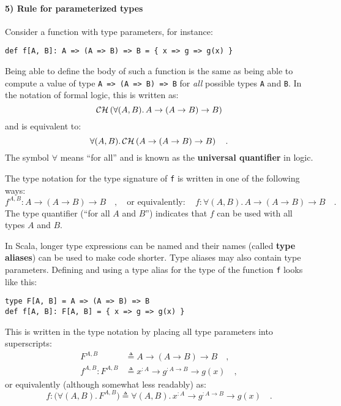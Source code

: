 \paragraph{5) Rule for parameterized types}

Consider a function with type parameters, for instance:
\begin{lstlisting}
def f[A, B]: A => (A => B) => B = { x => g => g(x) }
\end{lstlisting}
Being able to define the body of such a function is the same as being
able to compute a value of type \lstinline!A => (A => B) => B! for
\emph{all} possible types \lstinline!A! and \lstinline!B!. In the
notation of formal logic, this is written as:
\[
{\cal CH}\left(\forall(A,B).\,A\rightarrow(A\rightarrow B)\rightarrow B\right)
\]
and is equivalent to:
\[
\forall(A,B).\,{\cal CH}\left(A\rightarrow(A\rightarrow B)\rightarrow B\right)\quad.
\]
The symbol $\forall$ means \textsf{``}for all\textsf{''} and is known as the \textbf{universal
quantifier} in logic. 

The type notation for the type signature of \lstinline!f! is written
in one of the following ways:
\[
f^{A,B}:A\rightarrow\left(A\rightarrow B\right)\rightarrow B\quad,\quad\text{or equivalently}:\quad f:\forall(A,B).\,A\rightarrow\left(A\rightarrow B\right)\rightarrow B\quad.
\]
The type quantifier (\textsf{``}for all $A$ and $B$\textsf{''}) indicates that $f$
can be used with all types $A$ and $B$.

In Scala, longer type expressions can be named and their names (called
\textbf{type aliases}) can be used to make code
shorter. Type aliases may also contain type parameters. Defining and
using a type alias for the type of the function \lstinline!f! looks
like this:
\begin{lstlisting}
type F[A, B] = A => (A => B) => B
def f[A, B]: F[A, B] = { x => g => g(x) }
\end{lstlisting}
This is written in the type notation by placing all type parameters
into superscripts:
\begin{align*}
F^{A,B} & \triangleq A\rightarrow\left(A\rightarrow B\right)\rightarrow B\quad,\\
f^{A,B}:F^{A,B} & \triangleq x^{:A}\rightarrow g^{:A\rightarrow B}\rightarrow g(x)\quad,
\end{align*}
or equivalently (although somewhat less readably) as:
\[
f:\big(\forall(A,B).\,F^{A,B}\big)\triangleq\forall(A,B).\,x^{:A}\rightarrow g^{:A\rightarrow B}\rightarrow g(x)\quad.
\]

